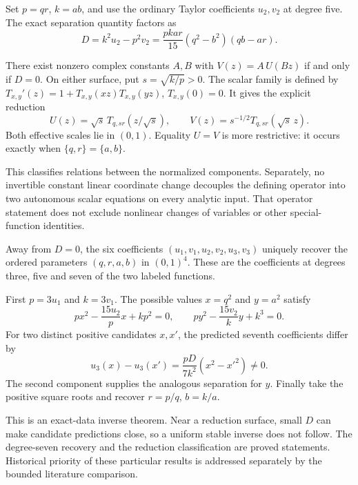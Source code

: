 Set $p=qr$, $k=ab$, and use the ordinary Taylor coefficients $u_2,v_2$
at degree five. The exact separation quantity factors as
\[
\boxed{D=k^2u_2-p^2v_2
=\frac{pk ar}{15}(q^2-b^2)(qb-ar).}
\]


There exist nonzero complex constants $A,B$ with $V(z)=A\,U(Bz)$
if and only if $D=0$. On either surface, put $s=\sqrt{k/p}>0$.
The scalar family is defined by
$T_{x,y}'(z)=1+T_{x,y}(xz)T_{x,y}(yz)$, $T_{x,y}(0)=0$.
It gives the explicit reduction
\[
U(z)=\sqrt{s}\,T_{q,sr}(z/\sqrt{s}),\qquad
V(z)=s^{-1/2}T_{q,sr}(\sqrt{s}\,z).
\]
Both effective scales lie in $(0,1)$. Equality $U=V$ is more restrictive:
it occurs exactly when $\{q,r\}=\{a,b\}$.

This classifies relations between the normalized components. Separately,
no invertible constant linear coordinate change decouples the defining
operator into two autonomous scalar equations on every analytic input.
That operator statement does not exclude nonlinear changes of variables
or other special-function identities.

Away from $D=0$, the six coefficients
$(u_1,v_1,u_2,v_2,u_3,v_3)$ uniquely recover the ordered parameters
$(q,r,a,b)$ in $(0,1)^4$. These are the coefficients at degrees three,
five and seven of the two labeled functions.


First $p=3u_1$ and $k=3v_1$. The possible values $x=q^2$ and $y=a^2$
satisfy
\[
p x^2-\frac{15u_2}{p}x+kp^2=0,\qquad
p y^2-\frac{15v_2}{k}y+k^3=0.
\]
For two distinct positive candidates $x,x'$, the predicted seventh
coefficients differ by
\[
u_3(x)-u_3(x')=\frac{pD}{7k^2}(x^2-x'^2)\ne0.
\]
The second component supplies the analogous separation for $y$.
Finally take the positive square roots and recover $r=p/q$, $b=k/a$.

This is an exact-data inverse theorem. Near a reduction surface, small
$D$ can make candidate predictions close, so a uniform stable inverse
does not follow. The degree-seven recovery and the reduction classification
are proved statements. Historical priority of these particular results
is addressed separately by the bounded literature comparison.

